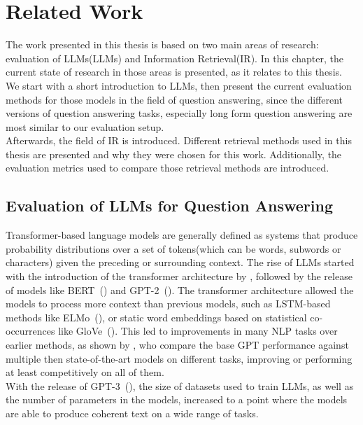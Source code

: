 \chapter{Related Work}\label{related-work}
The work presented in this thesis is based on two main areas of research: evaluation of LLMs(LLMs) and Information Retrieval(IR).
In this chapter, the current state of research in those areas is presented, as it relates to this thesis.
We start with a short introduction to LLMs, then present the current evaluation methods for those models in the field of question answering, since the different versions of question answering tasks, especially long form question answering are most similar to our evaluation setup.
\\
Afterwards, the field of IR is introduced.
Different retrieval methods used in this thesis are presented and why they were chosen for this work.
Additionally, the evaluation metrics used to compare those retrieval methods are introduced.

\section{Evaluation of LLMs for Question Answering}\label{sec:evaluation-of-large-language-models}
Transformer-based language models are generally defined as systems that produce probability distributions over a set of tokens(which can be words, subwords or characters) given the preceding or surrounding context.    
The rise of LLMs started with the introduction of the transformer architecture by \cite{vaswani:2017}, followed by the release of models like BERT~(\cite{devlin:2018}) and GPT-2~(\cite{radford:2018}).
The transformer architecture allowed the models to process more context than previous models, such as LSTM-based methods like ELMo~(\cite{peters:2018}), or static word embeddings based on statistical co-occurrences like GloVe~(\cite{pennington:2014}).
This led to improvements in many NLP tasks over earlier methods, as shown by \cite{radford:2018}, who compare the base GPT performance against multiple then state-of-the-art models on different tasks, improving or performing at least competitively on all of them.
\\
With the release of GPT-3~(\cite{brown:2020}), the size of datasets used to train LLMs, as well as the number of parameters in the models, increased to a point where the models are able to produce coherent text on a wide range of tasks.

